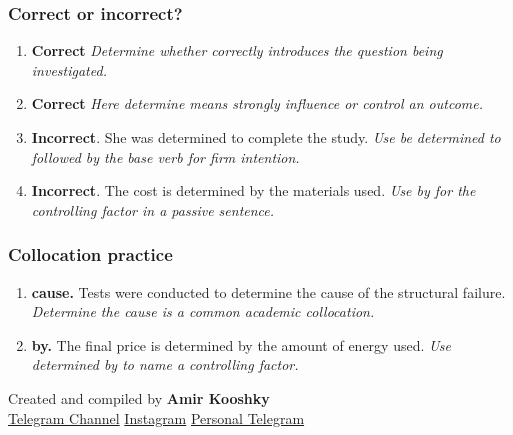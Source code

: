 \documentclass[11pt]{article}
\begin{document}
\subsubsection{Correct or incorrect?}
\begin{enumerate}
  \item \textbf{Correct} \emph{Determine whether correctly introduces the question being investigated.}
  \item \textbf{Correct} \emph{Here determine means strongly influence or control an outcome.}
  \item \textbf{Incorrect}. She was determined to complete the study. \emph{Use be determined to followed by the base verb for firm intention.}
  \item \textbf{Incorrect}. The cost is determined by the materials used. \emph{Use by for the controlling factor in a passive sentence.}
\end{enumerate}

\subsubsection{Collocation practice}
\begin{enumerate}
  \item \textbf{cause.} Tests were conducted to determine the cause of the structural failure. \emph{Determine the cause is a common academic collocation.}
  \item \textbf{by.} The final price is determined by the amount of energy used. \emph{Use determined by to name a controlling factor.}
\end{enumerate}

\vfill
\begin{center}
\small\color{Muted} Created and compiled by \textbf{Amir Kooshky}\\
\href{https://t.me/KooshkyTOEFL}{Telegram Channel}\quad\textbullet\quad
\href{https://www.instagram.com/kooshkytoefl}{Instagram}\quad\textbullet\quad
\href{https://t.me/KooshkyTOEFL\_pv}{Personal Telegram}
\end{center}
\end{document}
